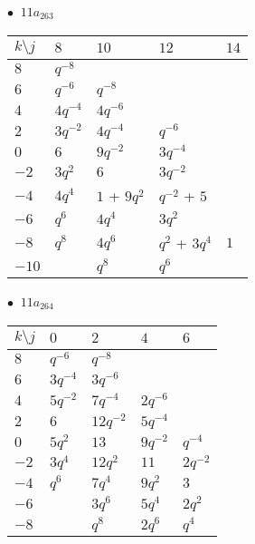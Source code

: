 \begin{minipage}{\linewidth}
$\bullet\ $ $11a_{263}$ \vspace{0.5em} \\
\begin{tabular}{l|llll}
$k \setminus j$ & $8$ & $10$ & $12$ & $14$ \\
\hline
$8$ & $q^{-8}$ &  &  &  \\
$6$ & $q^{-6}$ & $q^{-8}$ &  &  \\
$4$ & $4q^{-4}$ & $4q^{-6}$ &  &  \\
$2$ & $3q^{-2}$ & $4q^{-4}$ & $q^{-6}$ &  \\
$0$ & $6$ & $9q^{-2}$ & $3q^{-4}$ &  \\
$-2$ & $3q^{2}$ & $6$ & $3q^{-2}$ &  \\
$-4$ & $4q^{4}$ & $1$ + $9q^{2}$ & $q^{-2}$ + $5$ &  \\
$-6$ & $q^{6}$ & $4q^{4}$ & $3q^{2}$ &  \\
$-8$ & $q^{8}$ & $4q^{6}$ & $q^{2}$ + $3q^{4}$ & $1$ \\
$-10$ &  & $q^{8}$ & $q^{6}$ &  \\
\end{tabular}
\vspace{2em}
\end{minipage}
%
\begin{minipage}{\linewidth}
$\bullet\ $ $11a_{264}$ \vspace{0.5em} \\
\begin{tabular}{l|llll}
$k \setminus j$ & $0$ & $2$ & $4$ & $6$ \\
\hline
$8$ & $q^{-6}$ & $q^{-8}$ &  &  \\
$6$ & $3q^{-4}$ & $3q^{-6}$ &  &  \\
$4$ & $5q^{-2}$ & $7q^{-4}$ & $2q^{-6}$ &  \\
$2$ & $6$ & $12q^{-2}$ & $5q^{-4}$ &  \\
$0$ & $5q^{2}$ & $13$ & $9q^{-2}$ & $q^{-4}$ \\
$-2$ & $3q^{4}$ & $12q^{2}$ & $11$ & $2q^{-2}$ \\
$-4$ & $q^{6}$ & $7q^{4}$ & $9q^{2}$ & $3$ \\
$-6$ &  & $3q^{6}$ & $5q^{4}$ & $2q^{2}$ \\
$-8$ &  & $q^{8}$ & $2q^{6}$ & $q^{4}$ \\
\end{tabular}
\vspace{2em}
\end{minipage}
%
